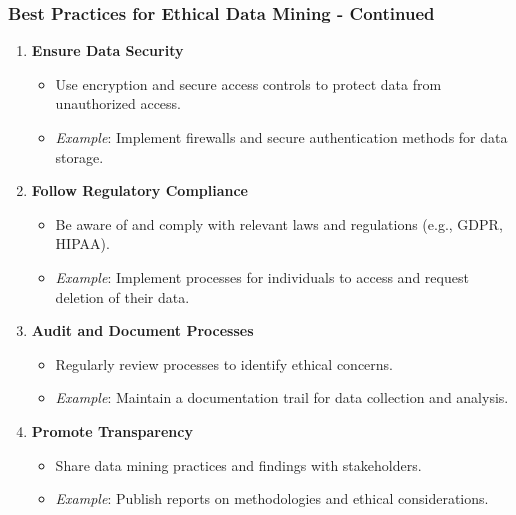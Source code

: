 \documentclass[aspectratio=169]{beamer}
\begin{document}
\begin{frame}[fragile]
    \frametitle{Best Practices for Ethical Data Mining - Continued}
    \begin{enumerate}[resume]
        \item \textbf{Ensure Data Security}
        \begin{itemize}
            \item Use encryption and secure access controls to protect data from unauthorized access.
            \item \textit{Example}: Implement firewalls and secure authentication methods for data storage.
        \end{itemize}

        \item \textbf{Follow Regulatory Compliance}
        \begin{itemize}
            \item Be aware of and comply with relevant laws and regulations (e.g., GDPR, HIPAA).
            \item \textit{Example}: Implement processes for individuals to access and request deletion of their data.
        \end{itemize}

        \item \textbf{Audit and Document Processes}
        \begin{itemize}
            \item Regularly review processes to identify ethical concerns.
            \item \textit{Example}: Maintain a documentation trail for data collection and analysis.
        \end{itemize}

        \item \textbf{Promote Transparency}
        \begin{itemize}
            \item Share data mining practices and findings with stakeholders.
            \item \textit{Example}: Publish reports on methodologies and ethical considerations.
        \end{itemize}
    \end{enumerate}
\end{frame}
\end{document}
